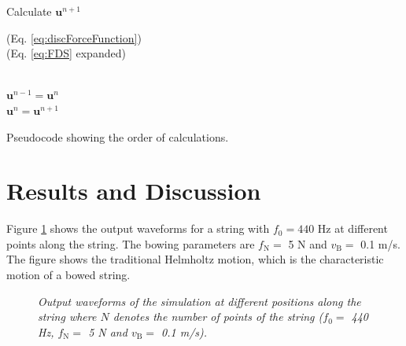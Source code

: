 \begin{algorithm}[ht]
{{{\begin{minipage}[c]{0.4\linewidth}
    Calculate $\mathbf{u}^{n+1}$
    \end{minipage} 
    \begin{minipage}[c]{0.5\linewidth}
    (Eq. \eqref{eq:discForceFunction})\\
    (Eq. \eqref{eq:FDS} expanded) 
    \end{minipage}
      \vspace{0.15cm}
     \\
    $\mathbf{u}^{n-1} = \mathbf{u}^n$\\
    $\mathbf{u}^{n} = \mathbf{u}^{n+1}$
     }
     }}
     \vspace{0.12cm}
     \caption{Pseudocode showing the order of calculations.\label{alg:calcOrder}}
    \end{algorithm}
    
    \section{Results and Discussion}\label{sec:results}
    
    Figure \ref{fig:output44100} shows the output waveforms for a string with $f_0 = 440$ Hz at different points along the string. The bowing parameters are $f_\text{N} =$ 5 N and $v_\text{B} =$ 0.1 m/s. The figure shows the traditional Helmholtz motion, which is the characteristic motion of a bowed string.
    
    \begin{figure}[ht]
      \centering
      \caption{\it Output waveforms of the simulation at different positions along the string where $N$ denotes the number of points of the string ($f_0 =$ 440 Hz, $f_\text{N} =$ 5 N and $v_\text{B} =$ 0.1 m/s). \label{fig:output44100}}
    \end{figure}
    
